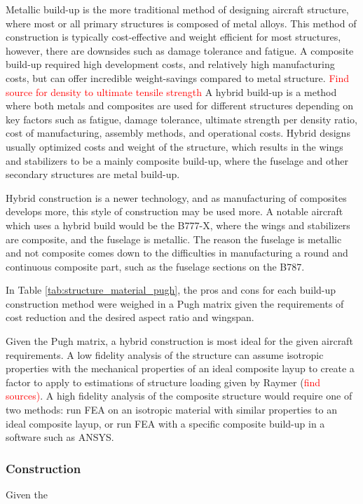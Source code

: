 Metallic build-up is the more traditional method of designing aircraft structure, where most or all primary structures is composed of metal alloys. This method of construction is typically cost-effective and weight efficient for most structures, however, there are downsides such as damage tolerance and fatigue. A composite build-up required high development costs, and relatively high manufacturing costs, but can offer incredible weight-savings compared to metal structure. \textcolor{red}{Find source for density to ultimate tensile strength} A hybrid build-up is a method where both metals and composites are used for different structures depending on key factors such as fatigue, damage tolerance, ultimate strength per density ratio, cost of manufacturing, assembly methods, and operational costs. Hybrid designs usually optimized costs and weight of the structure, which results in the wings and stabilizers to be a mainly composite build-up, where the fuselage and other secondary structures are metal build-up. 

Hybrid construction is a newer technology, and as manufacturing of composites develops more, this style of construction may be used more. A notable aircraft which uses a hybrid build would be the B777-X, where the wings and stabilizers are composite, and the fuselage is metallic. The reason the fuselage is metallic and not composite comes down to the difficulties in manufacturing a round and continuous composite part, such as the fuselage sections on the B787. 

In Table \ref{tab:structure_material_pugh}, the pros and cons for each build-up construction method were weighed in a Pugh matrix given the requirements of cost reduction and the desired aspect ratio and wingspan.


Given the Pugh matrix, a hybrid construction is most ideal for the given aircraft requirements. A low fidelity analysis of the structure can assume isotropic properties with the mechanical properties of an ideal composite layup to create a factor to apply to estimations of structure loading given by Raymer (\textcolor{red}{find sources)}. A high fidelity analysis of the composite structure would require one of two methods: run FEA on an isotropic material with similar properties to an ideal composite layup, or run FEA with a specific composite build-up in a software such as ANSYS.

\subsubsection{Construction}
Given the 